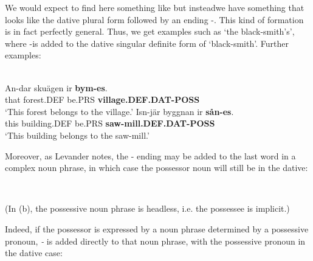 We would expect to find here something like but instead\textstyleLinguisticExample{ }we have something that looks like the dative plural form  followed by an ending \nobreakdash-. This kind of formation is in fact perfectly general. Thus, we get examples such as  ‘the black-smith’s’, where \nobreakdash-is added to the dative singular definite form  of  ‘black-smith’. Further examples:

\ea\label{}
\\
	\ea
		\gll An-dar  skuägen  ir  \textbf{bym-es}.\\
			that  forest.DEF  be.PRS  \textbf{village.DEF.DAT-POSS}\\
		\glt ‘This forest belongs to the village.’
	\ex
		\gll Isn-jär  byggnan  ir  \textbf{sån-es}.\\
		this  building.DEF  be.PRS  \textbf{saw-mill.DEF.DAT-POSS}\\
		\glt  ‘This building belongs to the saw-mill.’
	\z
\z 

Moreover, as Levander notes, the \nobreakdash- ending may be added to the last word in a complex noun phrase, in which case the possessor noun will still be in the dative:

\ea 
{}\\
	\z
\z 


(In (b), the possessive noun phrase is headless, i.e. the possessee is implicit.) 

Indeed, if the possessor is expressed by a noun phrase determined by a possessive pronoun,\textit{ {}-} is added directly to that noun phrase, with the possessive pronoun in the dative case:

